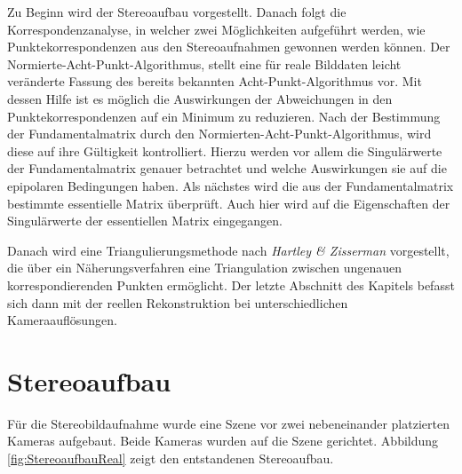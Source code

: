 
Zu Beginn wird der Stereoaufbau vorgestellt. Danach folgt die Korrespondenzanalyse, in welcher zwei Möglichkeiten aufgeführt werden, wie Punktekorrespondenzen aus den Stereoaufnahmen gewonnen werden können. Der Normierte-Acht-Punkt-Algorithmus, stellt eine für reale Bilddaten leicht veränderte Fassung des bereits bekannten Acht-Punkt-Algorithmus vor. Mit dessen Hilfe ist es möglich die Auswirkungen der Abweichungen in den Punktekorrespondenzen auf ein Minimum zu reduzieren. Nach der Bestimmung der Fundamentalmatrix durch den Normierten-Acht-Punkt-Algorithmus, wird diese auf ihre Gültigkeit kontrolliert. Hierzu werden vor allem die Singulärwerte der Fundamentalmatrix genauer betrachtet und welche Auswirkungen sie auf die epipolaren Bedingungen haben. Als nächstes wird die aus der Fundamentalmatrix bestimmte essentielle Matrix überprüft. Auch hier wird auf die Eigenschaften der Singulärwerte der essentiellen Matrix eingegangen.
\pagebreak

Danach wird eine Triangulierungsmethode nach \textit{Hartley \& Zisserman} \cite{HZ} vorgestellt, die über ein Näherungsverfahren eine Triangulation zwischen ungenauen korrespondierenden Punkten ermöglicht. Der letzte Abschnitt des Kapitels befasst sich dann mit der reellen Rekonstruktion bei unterschiedlichen Kameraauflösungen. \\



\section{Stereoaufbau}


Für die Stereobildaufnahme wurde eine Szene vor zwei nebeneinander platzierten Kameras aufgebaut. Beide Kameras wurden auf die Szene gerichtet. Abbildung \ref{fig:StereoaufbauReal} zeigt den entstandenen Stereoaufbau.\\


